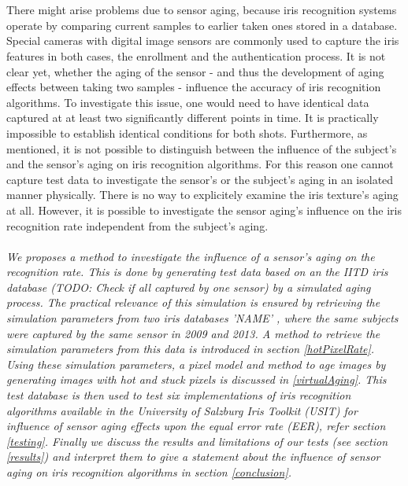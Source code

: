 \documentclass[10pt,twocolumn,letterpaper]{article}
\begin{document}
\\
\\ %
There might arise problems due to sensor aging, because iris recognition systems operate by comparing current samples to earlier taken ones stored in a database. Special cameras with digital image sensors are commonly used to capture the iris features in both cases, the enrollment and the authentication process. It is not clear yet, whether the aging of the sensor - and thus the development of aging effects between taking two samples - influence the accuracy of iris recognition algorithms. To investigate this issue, one would need to have identical data captured at at least two significantly different points in time. It is practically impossible to establish identical conditions for both shots. Furthermore, as mentioned, it is not possible to distinguish between the influence of the subject's and the sensor's aging on iris recognition algorithms. For this reason one cannot capture test data to investigate the sensor's or the subject's aging in an isolated manner physically. There is no way to explicitely examine the iris texture's aging at all. However, it is possible to investigate the sensor aging's influence on the iris recognition rate independent from the subject's aging.\\
\\
\textit{
We proposes a method to investigate the influence of a sensor's aging on the recognition rate. This is done by generating test data based on an the IITD iris database \cite{iitd} (TODO: Check if all captured by one sensor) by a simulated aging process. The practical relevance of this simulation is ensured by retrieving the simulation parameters from two iris databases 'NAME' \cite{agedIris}, where the same subjects were captured by the same sensor in 2009 and 2013. A method to retrieve the simulation parameters from this data is introduced in section \ref{hotPixelRate}. Using these simulation parameters, a pixel model and method to age images by generating images with hot and stuck pixels is discussed in \ref{virtualAging}. This test database is then used to test six implementations of iris recognition algorithms available in the University of Salzburg Iris Toolkit (USIT) \cite{usit} for influence of sensor aging effects upon the equal error rate (EER), refer section \ref{testing}. Finally we discuss the results and limitations of our tests (see section \ref{results}) and interpret them to give a statement about the influence of sensor aging on iris recognition algorithms in section \ref{conclusion}.}
\end{document}

